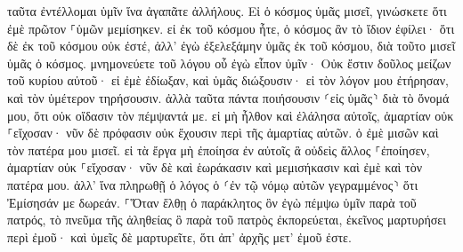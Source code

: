 \documentclass{openreader}
\begin{document}
ταῦτα ἐντέλλομαι ὑμῖν ἵνα ἀγαπᾶτε ἀλλήλους. 
Εἰ ὁ κόσμος ὑμᾶς μισεῖ, γινώσκετε ὅτι ἐμὲ πρῶτον ⸀ὑμῶν μεμίσηκεν. 
εἰ ἐκ τοῦ κόσμου ἦτε, ὁ κόσμος ἂν τὸ ἴδιον ἐφίλει· ὅτι δὲ ἐκ τοῦ κόσμου οὐκ ἐστέ, ἀλλ’ ἐγὼ ἐξελεξάμην ὑμᾶς ἐκ τοῦ κόσμου, διὰ τοῦτο μισεῖ ὑμᾶς ὁ κόσμος. 
μνημονεύετε τοῦ λόγου οὗ ἐγὼ εἶπον ὑμῖν· Οὐκ ἔστιν δοῦλος μείζων τοῦ κυρίου αὐτοῦ· εἰ ἐμὲ ἐδίωξαν, καὶ ὑμᾶς διώξουσιν· εἰ τὸν λόγον μου ἐτήρησαν, καὶ τὸν ὑμέτερον τηρήσουσιν. 
ἀλλὰ ταῦτα πάντα ποιήσουσιν ⸂εἰς ὑμᾶς⸃ διὰ τὸ ὄνομά μου, ὅτι οὐκ οἴδασιν τὸν πέμψαντά με. 
εἰ μὴ ἦλθον καὶ ἐλάλησα αὐτοῖς, ἁμαρτίαν οὐκ ⸀εἴχοσαν· νῦν δὲ πρόφασιν οὐκ ἔχουσιν περὶ τῆς ἁμαρτίας αὐτῶν. 
ὁ ἐμὲ μισῶν καὶ τὸν πατέρα μου μισεῖ. 
εἰ τὰ ἔργα μὴ ἐποίησα ἐν αὐτοῖς ἃ οὐδεὶς ἄλλος ⸀ἐποίησεν, ἁμαρτίαν οὐκ ⸀εἴχοσαν· νῦν δὲ καὶ ἑωράκασιν καὶ μεμισήκασιν καὶ ἐμὲ καὶ τὸν πατέρα μου. 
ἀλλ’ ἵνα πληρωθῇ ὁ λόγος ὁ ⸂ἐν τῷ νόμῳ αὐτῶν γεγραμμένος⸃ ὅτι Ἐμίσησάν με δωρεάν. 
⸀Ὅταν ἔλθῃ ὁ παράκλητος ὃν ἐγὼ πέμψω ὑμῖν παρὰ τοῦ πατρός, τὸ πνεῦμα τῆς ἀληθείας ὃ παρὰ τοῦ πατρὸς ἐκπορεύεται, ἐκεῖνος μαρτυρήσει περὶ ἐμοῦ· 
καὶ ὑμεῖς δὲ μαρτυρεῖτε, ὅτι ἀπ’ ἀρχῆς μετ’ ἐμοῦ ἐστε. 
\end{document}
